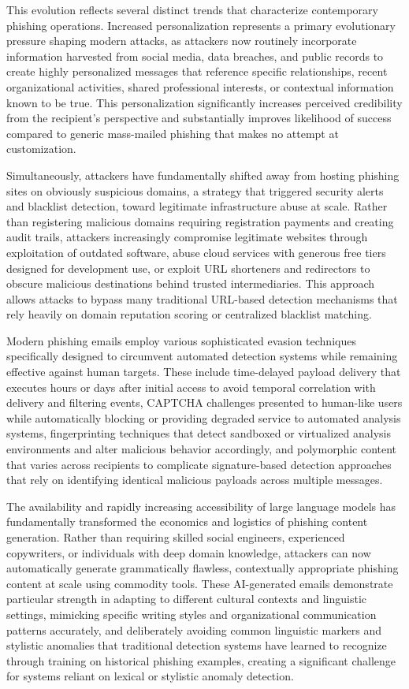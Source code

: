 This evolution reflects several distinct trends that characterize contemporary phishing operations. Increased personalization represents a primary evolutionary pressure shaping modern attacks, as attackers now routinely incorporate information harvested from social media, data breaches, and public records to create highly personalized messages that reference specific relationships, recent organizational activities, shared professional interests, or contextual information known to be true. This personalization significantly increases perceived credibility from the recipient's perspective and substantially improves likelihood of success compared to generic mass-mailed phishing that makes no attempt at customization.

Simultaneously, attackers have fundamentally shifted away from hosting phishing sites on obviously suspicious domains, a strategy that triggered security alerts and blacklist detection, toward legitimate infrastructure abuse at scale. Rather than registering malicious domains requiring registration payments and creating audit trails, attackers increasingly compromise legitimate websites through exploitation of outdated software, abuse cloud services with generous free tiers designed for development use, or exploit URL shorteners and redirectors to obscure malicious destinations behind trusted intermediaries. This approach allows attacks to bypass many traditional URL-based detection mechanisms that rely heavily on domain reputation scoring or centralized blacklist matching.

Modern phishing emails employ various sophisticated evasion techniques specifically designed to circumvent automated detection systems while remaining effective against human targets. These include time-delayed payload delivery that executes hours or days after initial access to avoid temporal correlation with delivery and filtering events, CAPTCHA challenges presented to human-like users while automatically blocking or providing degraded service to automated analysis systems, fingerprinting techniques that detect sandboxed or virtualized analysis environments and alter malicious behavior accordingly, and polymorphic content that varies across recipients to complicate signature-based detection approaches that rely on identifying identical malicious payloads across multiple messages.

The availability and rapidly increasing accessibility of large language models has fundamentally transformed the economics and logistics of phishing content generation. Rather than requiring skilled social engineers, experienced copywriters, or individuals with deep domain knowledge, attackers can now automatically generate grammatically flawless, contextually appropriate phishing content at scale using commodity tools. These \ac{AI}-generated emails demonstrate particular strength in adapting to different cultural contexts and linguistic settings, mimicking specific writing styles and organizational communication patterns accurately, and deliberately avoiding common linguistic markers and stylistic anomalies that traditional detection systems have learned to recognize through training on historical phishing examples, creating a significant challenge for systems reliant on lexical or stylistic anomaly detection.

